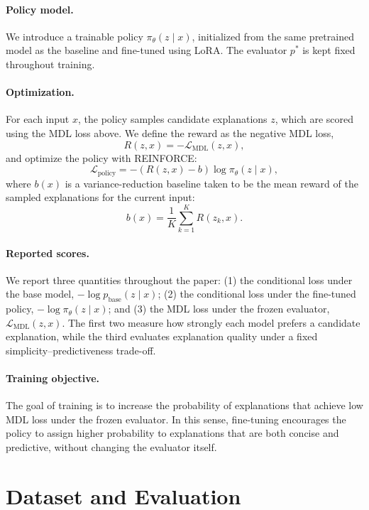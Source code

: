 \documentclass{article}
\theoremstyle{plain}
\theoremstyle{definition}
\theoremstyle{remark}
\begin{document}
\paragraph{Policy model.}
We introduce a trainable policy $\pi_\theta(z \mid x)$, initialized from the same pretrained model as the baseline and fine-tuned using LoRA. The evaluator $p^*$ is kept fixed throughout training.

\paragraph{Optimization.}
For each input $x$, the policy samples candidate explanations $z$, which are scored using the MDL loss above. We define the reward as the negative MDL loss,
\begin{equation}
R(z,x) = -\mathcal{L}_{\mathrm{MDL}}(z,x),
\end{equation}
and optimize the policy with REINFORCE:
\begin{equation}
\mathcal{L}_{\mathrm{policy}}
=
-(R(z,x)-b)\log \pi_\theta(z \mid x),
\end{equation}
where $b(x)$ is a variance-reduction baseline taken to be the mean reward of the sampled explanations for the current input:
\[
b(x)=\frac{1}{K}\sum_{k=1}^{K} R(z_k,x).
\]

\paragraph{Reported scores.}
We report three quantities throughout the paper:
(1) the conditional loss under the base model, $-\log p_{\text{base}}(z \mid x)$;
(2) the conditional loss under the fine-tuned policy, $-\log \pi_\theta(z \mid x)$; and
(3) the MDL loss under the frozen evaluator, $\mathcal{L}_{\mathrm{MDL}}(z,x)$.
The first two measure how strongly each model prefers a candidate explanation, while the third evaluates explanation quality under a fixed simplicity--predictiveness trade-off.

\paragraph{Training objective.}
The goal of training is to increase the probability of explanations that achieve low MDL loss under the frozen evaluator. In this sense, fine-tuning encourages the policy to assign higher probability to explanations that are both concise and predictive, without changing the evaluator itself.

\section{Dataset and Evaluation}
\end{document}
